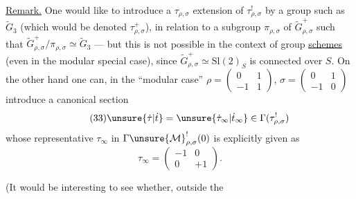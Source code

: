 \uline{Remark.} One would like to introduce a $\tau_{\rho,\sigma}$ extension  of $\tau_{\rho,\sigma}^{!}$ by a group such as $\widetilde G_3$ (which would be denoted $\tau_{\rho,\sigma}^{+}$), in relation to a subgroup $\pi_{\rho,\sigma}$ of $\widetilde G_{\rho,\sigma}^{+}$  such that $\widetilde G_{\rho,\sigma}^{+}/\pi_{\rho,\sigma}\simeq\widetilde G_3$ --- but this is not possible in the context of group \uline{schemes} (even in the modular special case), since $\widetilde G_{\rho,\sigma}^{+}\simeq\mathrm{Sl}(2)_S$ is   connected over $S$. On the other hand one can, in the ``modular case'' $\rho=\begin{pmatrix}0&1\\-1&1\end{pmatrix}$, $\sigma=\begin{pmatrix}0&1\\-1&0\end{pmatrix}$ introduce a canonical section
\[
\tag{33}
\unsure{\dot\tau|\dot t}=\unsure{\dot\tau_\infty|\dot t_\infty}\in\Gamma(\tau_{\rho,\sigma}^{!})
\]
whose representative $\tau_\infty$ in $\Gamma\unsure{\mathcal M}_{\rho,\sigma}^{!}(0)$ is explicitly given as
\[
\tag{34}
\tau_\infty=\begin{pmatrix}-1&0\\0&+1\end{pmatrix}.
\]

(It would be interesting to see whether, outside the


